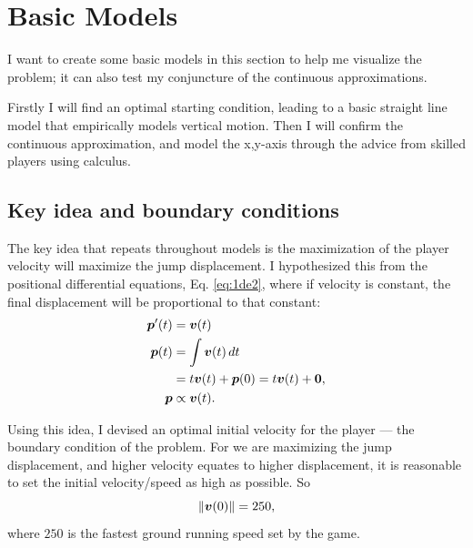 
\section{Basic Models}
I want to create some basic models in this section to help me visualize the problem; it can also test my conjuncture of the continuous approximations.

Firstly I will find an optimal starting condition, leading to a basic straight line model that empirically models vertical motion. Then I will confirm the continuous approximation, and model the x,y-axis
through the advice from skilled players using calculus.

\subsection{Key idea and boundary conditions}
The key idea that repeats throughout models is the maximization of the player velocity will maximize the jump displacement. I hypothesized this from the positional differential equations, Eq. \ref{eq:1de2}, where if velocity is constant, the final displacement will be proportional to that constant:
\begin{align*}
    \boldsymbol{p}'(t) &= \boldsymbol{v}(t)\\
    \boldsymbol{p}(t) &= \int \boldsymbol{v}(t) \, dt\\
    &= t\boldsymbol{v}(t) + \boldsymbol{p}(0) = t\boldsymbol{v}(t) + \boldsymbol{0},\\
    \boldsymbol{p} &\propto \boldsymbol{v}(t).
\end{align*}

Using this idea, I devised an optimal initial velocity for the player --- the boundary condition of the problem. For we are maximizing the jump displacement, and higher velocity equates to higher displacement, it is reasonable to set the initial velocity/speed as high as possible. So
\[
    \|\boldsymbol{v}(0)\| = 250,
\]
where $250$ is the fastest ground running speed set by the game.


